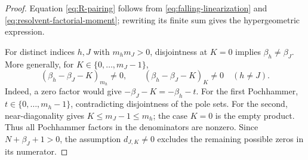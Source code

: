 \documentclass[10pt]{amsart}
\theoremstyle{plain}
\theoremstyle{definition}
\theoremstyle{remark}
\begin{document}
\begin{proof}
Equation \eqref{eq:R-pairing} follows from
\eqref{eq:falling-linearization} and
\eqref{eq:resolvent-factorial-moment}; rewriting its finite sum gives the
hypergeometric expression.

For distinct indices \(h,J\) with \(m_hm_J>0\), disjointness at \(K=0\) implies
\(\beta_h\ne\beta_J\). More generally, for
\(K\in\{0,\ldots,m_J-1\}\),
\begin{equation}
 (\beta_h-\beta_J-K)_{m_h}\ne0,
 \qquad
 (\beta_h-\beta_J-K)_K\ne0
 \quad(h\ne J).
 \label{eq:pole-separation-nonzero-Pochhammers}
\end{equation}
Indeed, a zero factor would give
\(-\beta_J-K=-\beta_h-t\). For the first Pochhammer,
\(t\in\{0,\ldots,m_h-1\}\), contradicting disjointness of the pole sets.
For the second, near-diagonality gives
\(K\le m_J-1\le m_h\); the case \(K=0\) is the empty product.
Thus all Pochhammer factors in the denominators are nonzero. Since
\(N+\beta_J+1>0\), the assumption \(d_{J,K}\ne0\) excludes the remaining
possible zeros in its numerator.


\end{proof}
\end{document}
